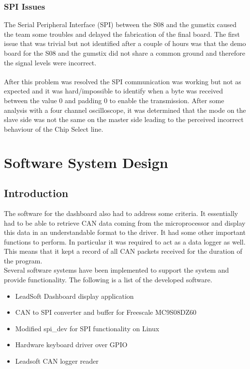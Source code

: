 \documentclass[11pt]{report} %
\begin{document}
	\subsection{SPI Issues}
	The Serial Peripheral Interface (SPI) between the S08 and the gumstix caused
	the team some troubles and delayed the fabrication of the final board. The
	first issue that was trivial but not identified after a couple of hours was
	that the demo board for the S08 and the gumstix did not share a common ground
	and therefore the signal levels were incorrect.\\
	\\
	After this problem was resolved the SPI communication was working but not as
	expected and it was hard/impossible to identify when a byte was received
	between the value 0 and padding 0 to enable the transmission. After some
	analysis with a four channel oscilloscope, it was determined that the mode
	on the slave side was not the same on the master side leading to the
	perceived incorrect behaviour of the Chip Select line.

\chapter{Software System Design}
	\section{Introduction}
	The software for the dashboard also had to address some criteria. It essentially had to be able to 
	retrieve CAN data coming from the microprocessor and display this data in an understandable format
	to the driver. It had some other important functions to perform. In particular it was required 
	to act as a data logger as well. This means that it kept a record of all CAN packets received
	for the duration of the program.\\

	Several software systems have been implemented to support the system and 
	provide functionality. The following is a list of the developed software.
	
	\begin{itemize}
		\item LeadSoft Dashboard display application
		\item CAN to SPI converter and buffer for Freescale MC9S08DZ60
		\item Modified spi\_dev for SPI functionality on Linux
		\item Hardware keyboard driver over GPIO
		\item Leadsoft CAN logger reader
	\end{itemize}
\end{document}
